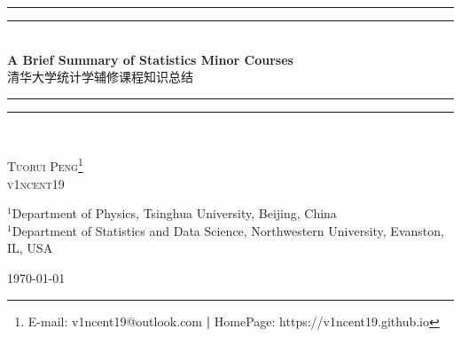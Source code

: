 \documentclass[x11names,11pt,a4paper,openany]{book}
\begin{document}
\begin{titlepage}
  \thispagestyle{myheadings}
  \begin{center}
      \vspace*{4cm}
{      \settowidth{\unitlength}{\Huge A Brief Summary of Statistics Minor Courses}
      \rule{\unitlength}{1.6pt}\vspace*{-\baselineskip}\vspace*{2pt}
      \rule{\unitlength}{0.4pt}\\[\baselineskip]
      \huge\textbf{A Brief Summary of Statistics Minor Courses}\\\LARGE\heiti 清华大学统计学辅修课程知识总结\\[0.3\baselineskip]
      \rule{\unitlength}{0.4pt}\vspace*{-\baselineskip}\vspace{3.2pt}
      \rule{\unitlength}{1.6pt}\\[\baselineskip]}
          
      \vspace{1.5cm}
{      \large\scshape Tuorui Peng\footnote{E-mail: {v1ncent19@outlook.com} \textbf{|} HomePage: {https://v1ncent19.github.io}}\\
      \ttfamily\normalsize v1ncent19}

      \vspace{1.5cm}
{      \normalshape\normalfont\small
       $ ^1 $Department of Physics, Tsinghua University, Beijing, China\\
       $ ^1 $Department of Statistics and Data Science, Northwestern University, Evanston, IL, USA}
          

      \vspace{1.5cm}
      \today
          
  \end{center}
\end{titlepage}





\pagestyle{preContent}
\tableofcontents
\newpage




\providecommand{\cmark}[2][]{%
  \begin{pgfonlayer}{marx}
    \node [nmark] at (c#2#1) {#2};
  \end{pgfonlayer}{marx}
  } 
\providecommand{\cmark}[2][]{\relax} 
\end{document}
